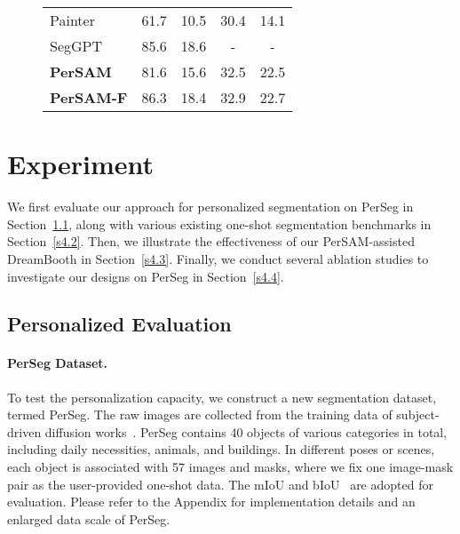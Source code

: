 \documentclass{article} \usepackage{iclr2024_conference,times}
\begin{document}
\begin{figure*}
\begin{minipage}[t!]{0.63\linewidth}
\begin{adjustbox}{width=\linewidth}
\begin{tabular}{lcccc}
      \cmidrule(lr){1-5}
      Painter & 61.7 & 10.5 & 30.4 & 14.1 \\
      SegGPT & 85.6 & 18.6 & - & - \vspace{0.05cm}\\
     \rowcolor{pink!12} \bf PerSAM & 81.6 & 15.6 & 32.5 & 22.5\\
      \rowcolor{pink!12}\bf PerSAM-F & 86.3 & 18.4 & 32.9 & 22.7 \\
	  \bottomrule
	\end{tabular}
\end{adjustbox}
\end{minipage}
\end{figure*}

\section{Experiment}
\vspace{-0.1cm}

We first evaluate our approach for personalized segmentation on PerSeg in Section~\ref{s4.1}, along with various existing one-shot segmentation benchmarks in Section~\ref{s4.2}. Then, we illustrate the effectiveness of our PerSAM-assisted DreamBooth in Section~\ref{s4.3}.
Finally, we conduct several ablation studies to investigate our designs on PerSeg in Section~\ref{s4.4}.

\subsection{Personalized Evaluation}
\label{s4.1}

\paragraph{PerSeg Dataset.}
To test the personalization capacity, we construct a new segmentation dataset, termed PerSeg. The raw images are collected from the training data of subject-driven diffusion works~\citep{ruiz2022dreambooth,gal2022image,kumari2022multi}. PerSeg contains 40 objects of various categories in total, including daily necessities, animals, and buildings. In different poses or scenes, each object is associated with 57 images and masks, where we fix one image-mask pair as the user-provided one-shot data. The mIoU and bIoU~\citep{cheng2021boundary} are adopted for evaluation. Please refer to the Appendix for implementation details and an enlarged data scale of PerSeg.
\vspace{-0.1cm}
\end{document}

